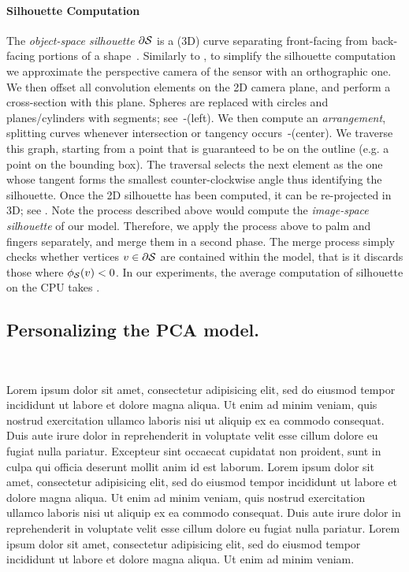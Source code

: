 \paragraph{Silhouette Computation}
The \emph{object-space silhouette} $\partial \mathcal{S}$ is a (3D) curve separating front-facing from back-facing portions of a shape~\cite[Sec.1]{olson2006eg}. Similarly to \cite{tagliasacchi2015robust}, to simplify the silhouette computation we approximate the perspective camera of the sensor with an orthographic one. We then offset all convolution elements on the 2D camera plane, and perform a cross-section with this plane. Spheres are replaced with circles and planes/cylinders with segments; see~-(left). We then compute an \emph{arrangement}, splitting curves whenever intersection or tangency occurs~-(center). We traverse this graph, starting from a point that is guaranteed to be on the outline (e.g. a point on the bounding box). The traversal selects the next element as the one whose tangent forms the smallest counter-clockwise angle thus identifying the silhouette. Once the 2D silhouette has been computed, it can be re-projected in 3D; see . Note the process described above would compute the \emph{image-space silhouette} of our model. Therefore, we apply the process above to palm and fingers separately, and merge them in a second phase. The merge process simply checks whether vertices $v \in \partial \mathcal{S}$ are contained within the model, that is it discards those where $\phi_{\mathcal{S}}(v)<0$. In our experiments, the average computation of silhouette on the CPU takes .
 
\subsection{Personalizing the PCA model.}
\\
\begin{DRAFT}
Lorem ipsum dolor sit amet, consectetur adipisicing elit, sed do eiusmod tempor incididunt ut labore et dolore magna aliqua. Ut enim ad minim veniam, quis nostrud exercitation ullamco laboris nisi ut aliquip ex ea commodo consequat. Duis aute irure dolor in reprehenderit in voluptate velit esse cillum dolore eu fugiat nulla pariatur. Excepteur sint occaecat cupidatat non proident, sunt in culpa qui officia deserunt mollit anim id est laborum. Lorem ipsum dolor sit amet, consectetur adipisicing elit, sed do eiusmod tempor incididunt ut labore et dolore magna aliqua. Ut enim ad minim veniam, quis nostrud exercitation ullamco laboris nisi ut aliquip ex ea commodo consequat. Duis aute irure dolor in reprehenderit in voluptate velit esse cillum dolore eu fugiat nulla pariatur. Lorem ipsum dolor sit amet, consectetur adipisicing elit, sed do eiusmod tempor incididunt ut labore et dolore magna aliqua. Ut enim ad minim veniam.
\end{DRAFT}
 

